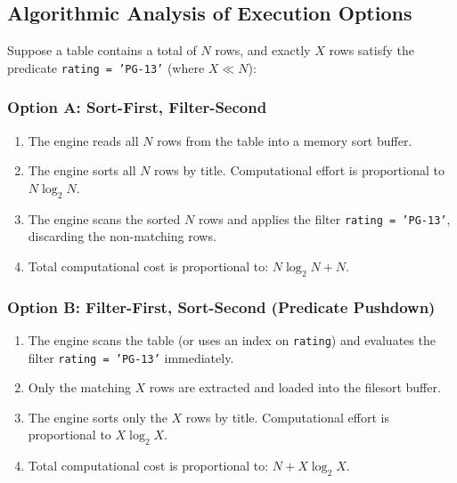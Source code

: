 \documentclass[10pt,journal,compsoc,onecolumn]{IEEEtran}
\begin{document}
\subsection{Algorithmic Analysis of Execution Options}
Suppose a table contains a total of $N$ rows, and exactly $X$ rows satisfy the predicate \texttt{rating = 'PG-13'} (where $X \ll N$):

\subsubsection{Option A: Sort-First, Filter-Second}
\begin{enumerate}
    \item The engine reads all $N$ rows from the table into a memory sort buffer.
    \item The engine sorts all $N$ rows by title. Computational effort is proportional to $N \log_2 N$.
    \item The engine scans the sorted $N$ rows and applies the filter \texttt{rating = 'PG-13'}, discarding the non-matching rows.
    \item Total computational cost is proportional to: $N \log_2 N + N$.
\end{enumerate}

\subsubsection{Option B: Filter-First, Sort-Second (Predicate Pushdown)}
\begin{enumerate}
    \item The engine scans the table (or uses an index on \texttt{rating}) and evaluates the filter \texttt{rating = 'PG-13'} immediately.
    \item Only the matching $X$ rows are extracted and loaded into the filesort buffer.
    \item The engine sorts only the $X$ rows by title. Computational effort is proportional to $X \log_2 X$.
    \item Total computational cost is proportional to: $N + X \log_2 X$.
\end{enumerate}
\end{document}
